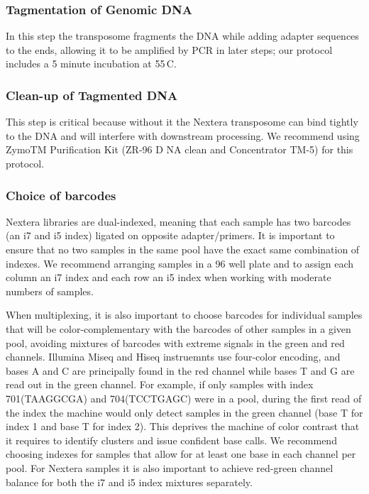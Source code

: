 \documentclass[graybox]{svmult}
\begin{document}
\subsubsection{Tagmentation of Genomic DNA}

In this step the transposome fragments the DNA while adding adapter sequences to the ends, allowing it to be amplified by PCR in later steps; our protocol includes a 5 minute incubation at 55\degree\,C.

\subsubsection{Clean-up of Tagmented DNA}

This step is critical because without it the Nextera transposome can bind tightly to the DNA and will interfere with downstream processing.  We recommend using ZymoTM Purification Kit (ZR-96 D NA clean and Concentrator TM-5) for this protocol. 

\subsubsection{Choice of barcodes }

Nextera libraries are dual-indexed, meaning that each sample has two barcodes (an i7 and i5 index) ligated on opposite adapter/primers.  It is important to ensure that no two samples in the same pool have the exact same combination of indexes. We recommend arranging samples in a 96 well plate and to assign each column an i7 index and each row an i5 index when working with moderate numbers of samples. 

When multiplexing, it is also important to choose barcodes for individual samples that will be color-complementary with the barcodes of other samples in a given pool, avoiding mixtures of barcodes with extreme signals in the green and red channels.
Illumina Miseq and Hiseq instruemnts use four-color encoding, and bases A and C are principally found in the red channel while bases T and G are read out in the green channel.
 For example, if only samples with index 701(TAAGGCGA) and 704(TCCTGAGC) were in a pool, during the first read of the index the machine would only detect samples in the green channel (base T for index 1 and base T for index 2).  This deprives the machine of color contrast that it requires to identify clusters and issue confident base calls.  We recommend choosing indexes for samples that allow for at least one base in each channel per pool. For Nextera samples it is also important to achieve red-green channel balance for both the i7 and i5 index mixtures separately. 
\end{document}
